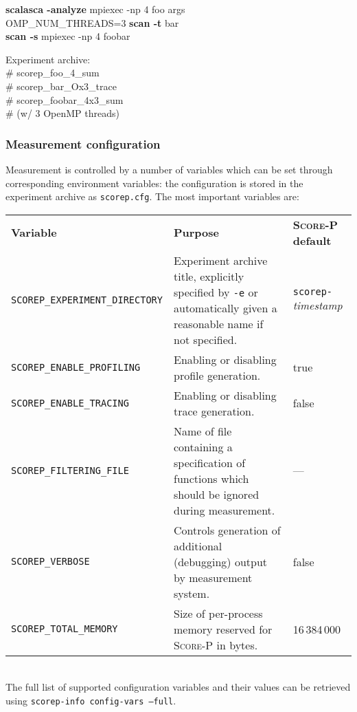 \documentclass[a4paper]{article}
\newcommand{\Scorep}{\textsc{Score-P}\xspace}
\begin{document}
\begin{itemize}
\begin{minipage}[t]{0.5\linewidth}
      \textbf{scalasca -analyze} mpiexec -np 4 foo args \\
      OMP\_NUM\_THREADS=3 \textbf{scan -t} bar \\
      \textbf{scan -s} mpiexec -np 4 foobar
    \end{minipage}
    \begin{minipage}[t]{0.325\linewidth}
      Experiment archive: \\\ttfamily
      \# scorep\_foo\_4\_sum \\
      \# scorep\_bar\_Ox3\_trace \\
      \# scorep\_foobar\_4x3\_sum \\
      \# (w/ 3 OpenMP threads)
    \end{minipage}
\end{itemize}


\subsubsection*{Measurement configuration}

Measurement is controlled by a number of variables which can be set through
corresponding environment variables: the configuration is stored in the
experiment archive as \texttt{scorep.cfg}. The most important variables are:
\\[1ex]
\begin{tabularx}{\linewidth}{lX@{\hspace*{10mm}}l}
  \textbf{Variable} & \textbf{Purpose} & \textbf{\Scorep default} \\

  \texttt{SCOREP\_EXPERIMENT\_DIRECTORY} &
    Experiment archive title, explicitly specified by \texttt{-e} or
    automatically given a reasonable name if not specified.
    &
    \texttt{scorep-}\textit{timestamp} \\

   \texttt{SCOREP\_ENABLE\_PROFILING} &
    Enabling or disabling profile generation.
    &
    true \\

   \texttt{SCOREP\_ENABLE\_TRACING} &
    Enabling or disabling trace generation.
    &
    false \\

 \texttt{SCOREP\_FILTERING\_FILE} &
    Name of file containing a specification of functions which should be
    ignored during measurement.
    &
    --- \\

   \texttt{SCOREP\_VERBOSE} &
    Controls generation of additional (debugging) output by measurement
    system. &
    false \\

  \texttt{SCOREP\_TOTAL\_MEMORY} &
    Size of per-process memory reserved for \Scorep in bytes. &
    16\,384\,000 \\
\end{tabularx}
\\[1ex]
The full list of supported configuration variables and their values can be retrieved using
\texttt{scorep-info config-vars --full}.
\end{document}
